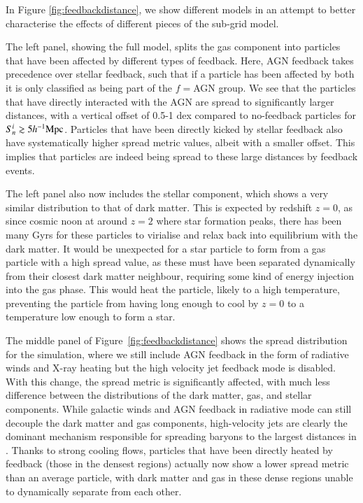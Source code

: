 In Figure \ref{fig:feedbackdistance}, we show different models in an
attempt to better characterise the effects of different pieces of the
\simba{} sub-grid model.

The left panel, showing the full \simba{} model, splits the 
gas component into particles that have been affected by different
types of feedback. Here, AGN feedback takes precedence over stellar
feedback, such that if a particle has been affected by both it is only
classified as being part of the $f=$AGN group. We see that the particles
that have directly interacted with the AGN are spread to significantly 
larger distances, with a vertical offset of 0.5-1 dex compared to no-feedback particles 
for $S_{n}^{i} \gtrsim 5h^{-1}{\rm Mpc}{}$. Particles that have been directly kicked by
stellar feedback also have systematically higher spread metric values,
albeit with a smaller offset. This implies that particles are indeed being spread to these large distances by feedback events.

The left panel also now includes the stellar component, which shows a very similar
distribution to that of dark matter. 
This is expected by redshift $z=0$, as since cosmic noon at
around $z=2$ where star formation peaks, there has been many Gyrs for these
particles to virialise and relax back into equilibrium with the dark matter.
It would be unexpected for a star particle to form from a gas particle with a
high spread value, as these must have been separated dynamically from their
closest dark matter neighbour, requiring some kind of energy injection into
the gas phase. This would heat the particle, likely to a high temperature,
preventing the particle from having long enough to cool by $z=0$ to a
temperature low enough to form a star.

The middle panel of Figure~\ref{fig:feedbackdistance} shows the spread distribution for the \nojet{} simulation, where we still include AGN feedback in the form of radiative winds and X-ray heating but the high velocity jet feedback mode is disabled. With this change, the spread metric is 
significantly affected, with much less difference between the distributions of
the dark matter, gas, and stellar components.
While galactic winds and AGN feedback in radiative mode can still decouple the dark matter and gas components, high-velocity jets are clearly the dominant mechanism responsible for spreading baryons to the largest distances in \simba{}.
Thanks to strong cooling flows, particles that have been directly heated by feedback (those in the densest regions) actually now show a lower spread metric than an average particle, with dark matter and gas in these dense regions unable to dynamically separate from each other.

